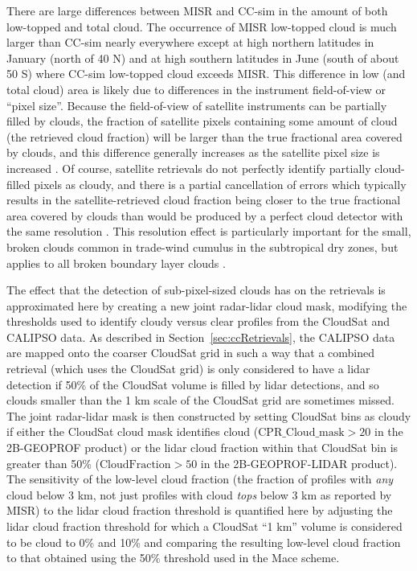 There are large differences between MISR and CC-sim in the amount of
both low-topped and total cloud. The occurrence of MISR low-topped cloud
is much larger than CC-sim nearly everywhere except at high northern
latitudes in January (north of 40 N) and at high southern latitudes in
June (south of about 50 S) where CC-sim low-topped cloud exceeds MISR.
This difference in low (and total cloud) area is likely due to
differences in the instrument field-of-view or ``pixel size''. Because
the field-of-view of satellite instruments can be partially filled by
clouds, the fraction of satellite pixels containing some amount of cloud
(the retrieved cloud fraction) will be larger than the true fractional
area covered by clouds, and this difference generally increases as the
satellite pixel size is increased \citep{digirolamo_and_davies_1997}. Of
course, satellite retrievals do not perfectly identify partially
cloud-filled pixels as cloudy, and there is a partial cancellation of
errors which typically results in the satellite-retrieved cloud fraction
being closer to the true fractional area covered by clouds than would be
produced by a perfect cloud detector with the same resolution
\citep{wielicki_and_parker_1992}. This resolution effect is particularly
important for the small, broken clouds common in trade-wind cumulus in
the subtropical dry zones, but applies to all broken boundary layer
clouds \citep{zhao_and_digirolamo_2006, marchand_et_al_2010}.

The effect that the detection of sub-pixel-sized clouds has on the
retrievals is approximated here by creating a new joint radar-lidar
cloud mask, modifying the thresholds used to identify cloudy versus
clear profiles from the CloudSat and CALIPSO data. As described in
Section~\ref{sec:ccRetrievals}, the CALIPSO data are mapped onto the
coarser CloudSat grid in such a way that a combined retrieval (which
uses the CloudSat grid) is only considered to have a lidar detection if
50\% of the CloudSat volume is filled by lidar detections, and so clouds
smaller than the 1 km scale of the CloudSat grid are sometimes missed.
The joint radar-lidar mask is then constructed by setting CloudSat bins
as cloudy if either the CloudSat cloud mask identifies cloud
(\(\textrm{CPR\_Cloud\_mask} > 20\) in the 2B-GEOPROF product) or the
lidar cloud fraction within that CloudSat bin is greater than 50\%
(\(\textrm{CloudFraction} > 50\) in the 2B-GEOPROF-LIDAR product). The
sensitivity of the low-level cloud fraction (the fraction of profiles
with \emph{any} cloud below 3 km, not just profiles with cloud
\emph{tops} below 3 km as reported by MISR) to the lidar cloud fraction
threshold is quantified here by adjusting the lidar cloud fraction
threshold for which a CloudSat ``1 km'' volume is considered to be cloud
to 0\% and 10\% and comparing the resulting low-level cloud fraction to
that obtained using the 50\% threshold used in the Mace scheme.

